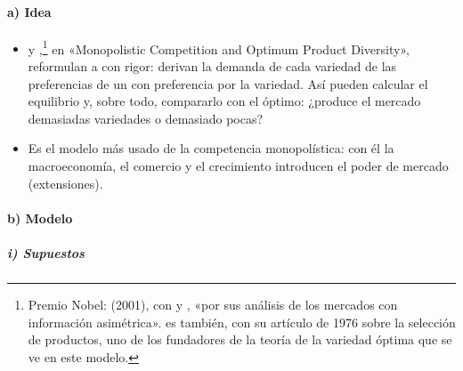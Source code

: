 \documentclass[11pt]{article}
\begin{document}
\paragraph{a) Idea}

\begin{itemize}
\item {} y ,\footnote{Premio Nobel:  (2001), con  y , «por sus análisis de los mercados con información asimétrica»\nocite{Nobel2001AkerlofSpenceStiglitz}.  es también, con su artículo de 1976 sobre la selección de productos, uno de los fundadores de la teoría de la variedad óptima que se ve en este modelo\nocite{Spence1976Product}.} en «Monopolistic Competition and Optimum Product Diversity»\nocite{DixitStiglitz1977Monopolistic}, reformulan a  con rigor: derivan la demanda de cada variedad de las preferencias de un  con preferencia por la variedad. Así pueden calcular el equilibrio y, sobre todo, compararlo con el óptimo: ¿produce el mercado demasiadas variedades o demasiado pocas?
\item Es el modelo más usado de la competencia monopolística: con él la macroeconomía, el comercio y el crecimiento introducen el poder de mercado (extensiones).
\end{itemize}

\paragraph{b) Modelo}

\subparagraph{i) Supuestos}
\end{document}
